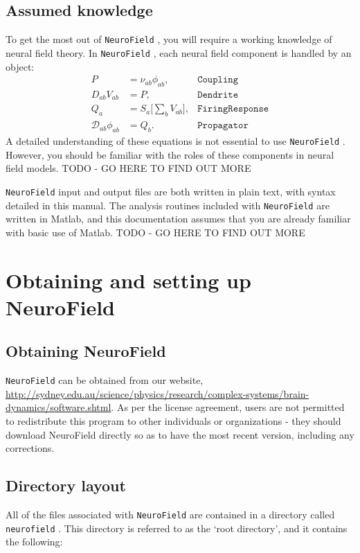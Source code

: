 \documentclass[12pt,a4paper]{article}
\newcommand{\type}[1]{{\small\small\tt #1} }
\newcommand{\NF}[0]{\type{NeuroField}}
\begin{document}
\subsection*{Assumed knowledge}
To get the most out of \NF, you will require a working knowledge of neural field theory. In \NF, each neural field component is handled by an object:
\begin{align*}
    P &= \nu_{ab}\phi_{ab}, & \mathtt{Coupling}\\
    D_{ab}V_{ab} &= P, & \mathtt{Dendrite}\\
    Q_a &= S_a \big[\sum_b V_{ab} \big], & \mathtt{FiringResponse}\\
    \mathcal{D}_{ab}\phi_{ab} &= Q_b.&  \mathtt{Propagator}
\end{align*}
A detailed understanding of these equations is not essential to use \NF. However, you should be familiar with the roles of these components in neural field models. TODO - GO HERE TO FIND OUT MORE

\NF input and output files are both written in plain text, with syntax detailed in this manual. The analysis routines included with \NF are written in Matlab, and this documentation assumes that you are already familiar with basic use of Matlab. TODO - GO HERE TO FIND OUT MORE

\section{Obtaining and setting up NeuroField}
\label{sec:obtain}

\subsection{Obtaining NeuroField}

\NF can be obtained from our website, \url{http://sydney.edu.au/science/physics/research/complex-systems/brain-dynamics/software.shtml}. As per the license agreement, users are not permitted to redistribute this program to other individuals or organizations - they should download NeuroField directly so as to have the most recent version, including any corrections.

\subsection{Directory layout}

All of the files associated with \NF are contained in a directory called \type{neurofield}. This directory is referred to as the `root directory', and it contains the following:
\end{document}
